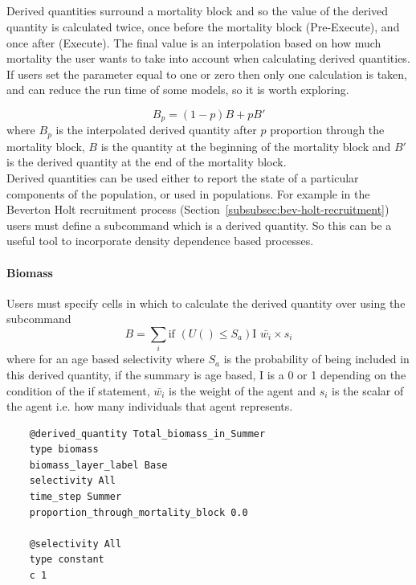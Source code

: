 \subsection{\label{sec:derived-quantities}}
Derived quantities surround a mortality block and so the value of the derived quantity is calculated twice, once before the mortality block (Pre-Execute), and once after (Execute). The final value is an interpolation based on how much mortality the user wants to take into account when calculating derived quantities. If users set the  parameter equal to one or zero then only one calculation is taken, and can reduce the run time of some models, so it is worth exploring.

\begin{equation}
	B_p = (1 - p)B + pB'
\end{equation}
where $B_p$ is the interpolated derived quantity after $p$ proportion through the mortality block, $B$ is the quantity at the beginning of the mortality block and $B'$ is the derived quantity at the end of the mortality block.\\

Derived quantities can be used either to report the state of a particular components of the population, or used in populations. For example in the Beverton Holt recruitment process (Section~\ref{subsubsec:bev-holt-recruitment}) users must define a subcommand  which is a derived quantity. So this can be a useful tool to incorporate density dependence based processes.

\paragraph*{Biomass}\label{para:biomass}
Users must specify cells in which to calculate the derived quantity over using the subcommand 
\begin{equation}
	B = \sum_i \text{if }(U() \leq S_a)\text{I } \bar{w_i} \times s_i
\end{equation}
where for an age based selectivity where $S_a$ is the probability of being included in this derived quantity, if the summary is age based, I is a 0 or 1 depending on the condition of the if statement, $\bar{w_i}$ is the weight of the agent and $s_i$ is the scalar of the agent i.e. how many individuals that agent represents.
{\small{\begin{verbatim}
	@derived_quantity Total_biomass_in_Summer
	type biomass
	biomass_layer_label Base
	selectivity All
	time_step Summer
	proportion_through_mortality_block 0.0
	
	@selectivity All
	type constant
	c 1
\end{verbatim}}}


